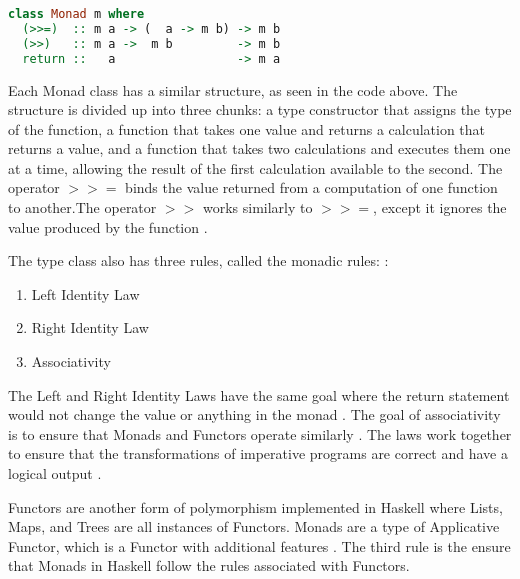 \documentclass{article}
\begin{document}
\begin{lstlisting}[language=haskell]
class Monad m where
  (>>=)  :: m a -> (  a -> m b) -> m b
  (>>)   :: m a ->  m b         -> m b
  return ::   a                 -> m a
\end{lstlisting}

\medskip\noindent
Each Monad class has a similar structure, as seen in the code above. The structure is divided up into three chunks: a type constructor that assigns the type of the function, a function that takes one value and returns a calculation that returns a value, and a function that takes two calculations and executes them one at a time, allowing the result of the first calculation available to the second. The operator $>>=$ binds the value returned from a computation of one function to another.The operator $>>$ works similarly to $>>=$, except it ignores the value produced by the function \cite{FL Monads}.

\medskip\noindent
The type class also has three rules, called the monadic rules: \cite{TP Monads}:

\begin{enumerate}
    \item Left Identity Law
    \item Right Identity Law
    \item Associativity
\end{enumerate}

\noindent
The Left and Right Identity Laws have the same goal where the return statement would not change the value or anything in the monad \cite{TP Monads}. The goal of associativity is to ensure that Monads and Functors operate similarly \cite{TP Monads}. The laws work together to ensure that the transformations of imperative programs are correct and have a logical output \cite{Monad Laws}.

\medskip\noindent
Functors are another form of polymorphism implemented in Haskell where Lists, Maps, and Trees are all instances of Functors. Monads are a type of Applicative Functor, which is a Functor with additional features \cite{TP Functors}. The third rule is the ensure that Monads in Haskell follow the rules associated with Functors. 
\end{document}
